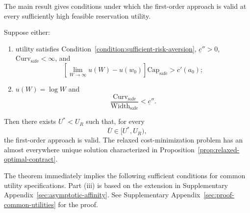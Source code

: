 The main result gives conditions under which the first-order approach is valid
at every sufficiently high feasible reservation utility.

\begin{theorem}
\label{thm:main}
Suppose either:
\begin{enumerate}
    \renewcommand{\labelenumi}{(\roman{enumi})}
    \item utility satisfies Condition~\ref{condition:sufficient-risk-aversion}, $\underline c''>0$,
    $\mathrm{Curv}_{\mathrm{safe}}<\infty$, and
    \[
        \left[\lim_{W\to\infty}u(W)-u(w_0)\right]
        \mathrm{Cap}_{\mathrm{safe}}>c'(a_0);
    \]
    \item $u(W)=\log W$ and
    \begin{equation}
        \frac{\mathrm{Curv}_{\mathrm{safe}}}
        {\mathrm{Width}_{\mathrm{safe}}}
        <\underline c''.
        \label{eq:log-curvature-width-condition}
    \end{equation}
\end{enumerate}
Then there exists $U^*<U_R$ such that, for every
\[
    \bar U\in[U^*,U_R),
\]
the first-order approach is valid. The relaxed cost-minimization problem has an almost everywhere unique solution characterized in Proposition~\ref{prop:relaxed-optimal-contract}.
\end{theorem}

The theorem immediately implies the following sufficient conditions for common utility specifications. Part (iii) is based on the extension in Supplementary Appendix~\ref{sec:asymptotic-affinity}. See Supplementary Appendix~\ref{sec:proof-common-utilities} for the proof.

